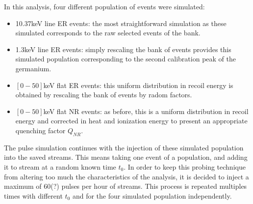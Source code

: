 In this analysis, four different population of events were simulated:
\begin{itemize}
	\item 10.37keV line ER events: the most straightforward simulation as these simulated corresponds to the raw selected events of the bank.
	\item 1.3keV line ER events: simply rescaling the bank of events provides this simulated population corresponding to the second calibration peak of the germanium.
	\item $[0-50]$keV flat ER events: this uniform distribution in recoil energy is obtained by rescaling the bank of events by radom factors.
	\item $[0-50]$keV flat NR events: as before, this is a uniform distribution in recoil energy and corrected in heat and ionization energy to present an appropriate quenching factor $Q_{NR}$.
\end{itemize}

The pulse simulation continues with the injection of these simulated population into the saved streams. This means taking one event of a population, and adding it to stream at a random known time $t_0$. In order to keep this probing technique from altering too much the characteristics of the analysis, it is decided to inject a maximum of 60(?) pulses per hour of streams. This process is repeated multiples times with different $t_0$ and for the four simulated population independently.

